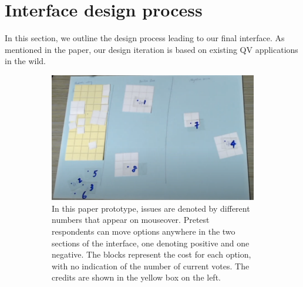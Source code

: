 \appendix
\section{Interface design process}\label{apdx:design}
In this section, we outline the design process leading to our final interface. As mentioned in the paper, our design iteration is based on existing QV applications in the wild.

\begin{figure}[H]
    \centering
    \begin{subfigure}[b]{0.54\textwidth}
        \centering
        \includegraphics[width=\textwidth]{content/image/prototypes/1.2_paper_qv_single.png}
        \caption{In this paper prototype, issues are denoted by different numbers that appear on mouseover. Pretest respondents can move options anywhere in the two sections of the interface, one denoting positive and one negative. The blocks represent the cost for each option, with no indication of the number of current votes. The credits are shown in the yellow box on the left.}
        \label{fig:horizontal_paper}
    \end{subfigure}
    \hfill
    \begin{subfigure}[b]{0.42\textwidth}
        \centering

\end{subfigure}
\end{figure}
